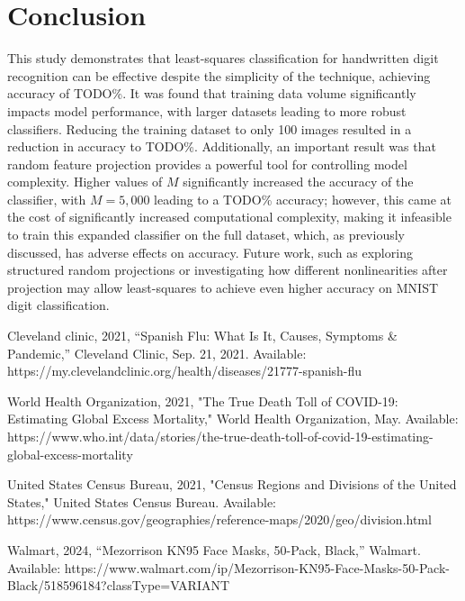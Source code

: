\documentclass[conference]{IEEEtran}
\begin{document}
\section{Conclusion}

This study demonstrates that least-squares classification for handwritten digit recognition can be effective despite the simplicity of the technique, achieving accuracy of TODO\%. It was found that training data volume significantly impacts model performance, with larger datasets leading to more robust classifiers. Reducing the training dataset to only 100 images resulted in a reduction in accuracy to TODO\%. Additionally, an important result was that random feature projection provides a powerful tool for controlling model complexity. Higher values of $M$ significantly increased the accuracy of the classifier, with $M = 5,000$ leading to a TODO\% accuracy; however, this came at the cost of significantly increased computational complexity, making it infeasible to train this expanded classifier on the full dataset, which, as previously discussed, has adverse effects on accuracy. Future work, such as exploring structured random projections or investigating how different nonlinearities after projection may allow least-squares to achieve even higher accuracy on MNIST digit classification.

\begin{thebibliography}{00}

Cleveland clinic, 2021, “Spanish Flu: What Is It, Causes, Symptoms \& Pandemic,” Cleveland Clinic, Sep. 21, 2021. Available: https://my.clevelandclinic.org/health/diseases/21777-spanish-flu

World Health Organization, 2021, "The True Death Toll of COVID-19: Estimating Global Excess Mortality," World Health Organization, May. Available: https://www.who.int/data/stories/the-true-death-toll-of-covid-19-estimating-global-excess-mortality

United States Census Bureau, 2021, "Census Regions and Divisions of the United States," United States Census Bureau. Available: https://www.census.gov/geographies/reference-maps/2020/geo/division.html

Walmart, 2024, “Mezorrison KN95 Face Masks, 50-Pack, Black,” Walmart. Available: https://www.walmart.com/ip/Mezorrison-KN95-Face-Masks-50-Pack-Black/518596184?classType=VARIANT

\end{thebibliography}
\end{document}
